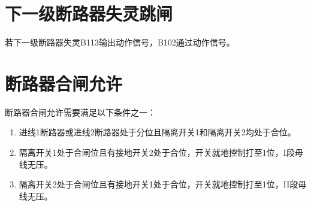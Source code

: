 \section{下一级断路器失灵跳闸}

若下一级断路器失灵B113输出动作信号，B102通过动作信号。

\section{断路器合闸允许}
断路器合闸允许需要满足以下条件之一：

\begin{enumerate}
	\item 进线1断路器或进线2断路器处于分位且隔离开关1和隔离开关2均处于合位。
	\item 隔离开关1处于合闸位且有接地开关2处于合位，开关就地控制打至1位，I段母线无压。
	\item 隔离开关2处于合闸位且有接地开关1处于合位，开关就地控制打至1位，II段母线无压。
\end{enumerate}
